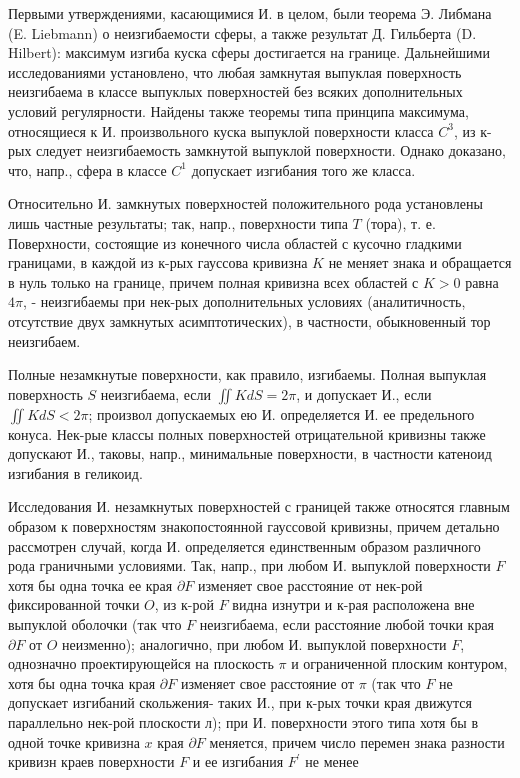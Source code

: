 \documentclass[10pt]{article}
\begin{document}
Первыми утверждениями, касающимися И. в целом, были теорема Э. Либмана (E. Liebmann) о неизгибаемости сферы, а также результат Д. Гильберта (D. Hilbert): максимум изгиба куска сферы достигается на границе. Дальнейшими исследованиями установлено, что любая замкнутая выпуклая поверхность неизгибаема в классе выпуклых поверхностей без всяких дополнительных условий регулярности. Найдены также теоремы типа принципа максимума, относящиеся к И. произвольного куска выпуклой поверхности класса $C^{3}$, из к-рых следует неизгибаемость замкнутой выпуклой поверхности. Однако доказано, что, напр., сфера в классе $C^{1}$ допускает изгибания того же класса.



Относительно И. замкнутых поверхностей положительного рода установлены лишь частные результаты; так, напр., поверхности типа $T$ (тора), т. е. Поверхности, состоящие из конечного числа областей с кусочно гладкими границами, в каждой из к-рых гауссова кривизна $K$ не меняет знака и обращается в нуль только на границе, причем полная кривизна всех областей с $K>0$ равна $4 \pi$, - неизгибаемы при нек-рых дополнительных условиях (аналитичность, отсутствие двух замкнутых асимптотических), в частности, обыкновенный тор неизгибаем.



Полные незамкнутые поверхности, как правило, изгибаемы. Полная выпуклая поверхность $S$ неизгибаема, если $\iint K d S=2 \pi$, и допускает И., если $\iint K d S<2 \pi$; произвол допускаемых ею И. определяется И. ее предельного конуса. Нек-рые классы полных поверхностей отрицательной кривизны также допускают И., таковы, напр., минимальные поверхности, в частности катеноид изгибания в геликоид.



Исследования И. незамкнутых поверхностей с границей также относятся главным образом к поверхностям знакопостоянной гауссовой кривизны, причем детально рассмотрен случай, когда И. определяется единственным образом различного рода граничными условиями. Так, напр., при любом И. выпуклой поверхности $F$ хотя бы одна точка ее края $\partial F$ изменяет свое расстояние от нек-рой фиксированной точки $O$, из к-рой $F$ видна изнутри и к-рая расположена вне выпуклой оболочки (так что $F$ неизгибаема, если расстояние любой точки края $\partial F$ от $O$ неизменно); аналогично, при любом И. выпуклой поверхности $F$, однозначно проектирующейся на плоскость $\pi$ и ограниченной плоским контуром, хотя бы одна точка края $\partial F$ изменяет свое расстояние от $\pi$ (так что $F$ не допускает изгибаний скольжения- таких И., при к-рых точки края движутся параллельно нек-рой плоскости л); при И. поверхности этого типа хотя бы в одной точке кривизна $x$ края $\partial F$ меняется, причем число перемен знака разности кривизн краев поверхности $F$ и ее изгибания $F^{\prime}$ не менее
\end{document}
